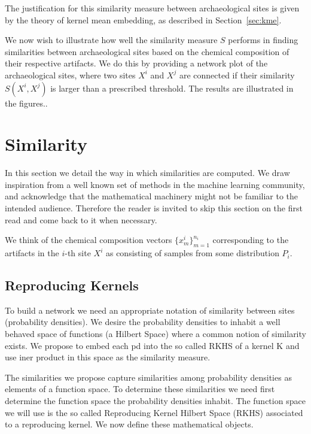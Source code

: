 The justification for this similarity measure between archaeological sites is given by the theory of kernel mean embedding, as described in Section~\ref{sec:kme}.

We now wish to illustrate how well the similarity measure $S$ performs in finding similarities between archaeological sites based on the chemical composition of their respective artifacts. We do this by providing a network plot of the archaeological sites, where two sites $X^i$ and $X^j$ are connected if their similarity $S(X^i,X^j)$ is larger than a prescribed threshold. The results are illustrated in the figures..

\section{Similarity}

\label{sec:similarity}

In this section we detail the way in which similarities are computed. We draw inspiration from a well known set of methods in the machine learning community, and acknowledge that the mathematical machinery might not be familiar to the intended audience. Therefore the reader is invited to skip this section on the first read and come back to it when necessary.

We think of the chemical composition vectors $\{x^i_m\}_{m=1}^{n_i}$ corresponding to the artifacts in the $i$-th site $X^i$ as consisting of samples from some distribution $P_i$.

\subsection{Reproducing Kernels}

\label{kernels}

To build a network we need an appropriate notation of similarity between sites (probability densities). We desire the probability densities to inhabit a well behaved space of functions (a Hilbert Space) where a common notion of similarity exists. We propose to embed each pd into the so called RKHS of a kernel K and use iner product in this space as the similarity measure.

The similarities we propose capture similarities among probability densities as elements of a function space. To determine these similarities we need first determine the function space the probability densities inhabit. The function space we will use is the so called Reproducing Kernel Hilbert Space (RKHS) associated to a reproducing kernel. We now define these mathematical objects.

